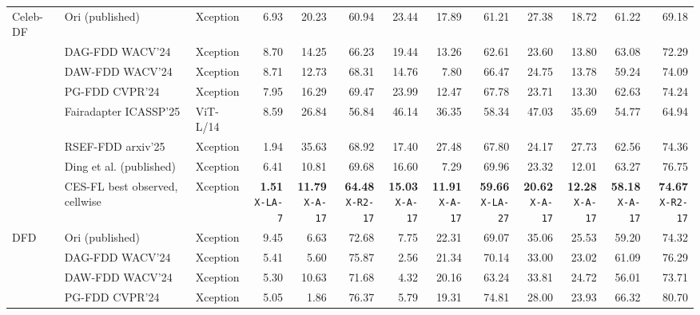 \documentclass[10pt]{article}
\begin{document}
{\begin{tabular*}{\linewidth}{@{\extracolsep{\fill}}lllrrrrrrrrrr}
\midrule
Celeb-DF & Ori (published) & Xception & 6.93 & 20.23 & 60.94 & 23.44 & 17.89 & 61.21 & 27.38 & 18.72 & 61.22 & 69.18\\
 & DAG-FDD WACV'24 & Xception & 8.70 & 14.25 & 66.23 & 19.44 & 13.26 & 62.61 & 23.60 & 13.80 & 63.08 & 72.29\\
 & DAW-FDD WACV'24 & Xception & 8.71 & 12.73 & 68.31 & 14.76 & 7.80 & 66.47 & 24.75 & 13.78 & 59.24 & 74.09\\
 & PG-FDD CVPR'24 & Xception & 7.95 & 16.29 & 69.47 & 23.99 & 12.47 & 67.78 & 23.71 & 13.30 & 62.63 & 74.24\\
 & Fairadapter ICASSP'25 & ViT-L/14 & 8.59 & 26.84 & 56.84 & 46.14 & 36.35 & 58.34 & 47.03 & 35.69 & 54.77 & 64.94\\
 & RSEF-FDD arxiv'25 & Xception & 1.94 & 35.63 & 68.92 & 17.40 & 27.48 & 67.80 & 24.17 & 27.73 & 62.56 & 74.36\\
 & Ding et al. (published) & Xception & 6.41 & 10.81 & 69.68 & 16.60 & 7.29 & 69.96 & 23.32 & 12.01 & 63.27 & 76.75\\
\rowcolor{blue!8} & CES-FL best observed, cellwise & Xception & \shortstack{\textbf{1.51}\\{\tiny\texttt{X-LA-7}}} & \shortstack{\textbf{11.79}\\{\tiny\texttt{X-A-17}}} & \shortstack{\textbf{64.48}\\{\tiny\texttt{X-R2-17}}} & \shortstack{\textbf{15.03}\\{\tiny\texttt{X-A-17}}} & \shortstack{\textbf{11.91}\\{\tiny\texttt{X-A-17}}} & \shortstack{\textbf{59.66}\\{\tiny\texttt{X-LA-27}}} & \shortstack{\textbf{20.62}\\{\tiny\texttt{X-A-17}}} & \shortstack{\textbf{12.28}\\{\tiny\texttt{X-A-17}}} & \shortstack{\textbf{58.18}\\{\tiny\texttt{X-A-17}}} & \shortstack{\textbf{74.67}\\{\tiny\texttt{X-R2-17}}}\\
\midrule
DFD & Ori (published) & Xception & 9.45 & 6.63 & 72.68 & 7.75 & 22.31 & 69.07 & 35.06 & 25.53 & 59.20 & 74.32\\
 & DAG-FDD WACV'24 & Xception & 5.41 & 5.60 & 75.87 & 2.56 & 21.34 & 70.14 & 33.00 & 23.02 & 61.09 & 76.29\\
 & DAW-FDD WACV'24 & Xception & 5.30 & 10.63 & 71.68 & 4.32 & 20.16 & 63.24 & 33.81 & 24.72 & 56.01 & 73.71\\
 & PG-FDD CVPR'24 & Xception & 5.05 & 1.86 & 76.37 & 5.79 & 19.31 & 74.81 & 28.00 & 23.93 & 66.32 & 80.70\\

\end{tabular*}}
\end{document}
